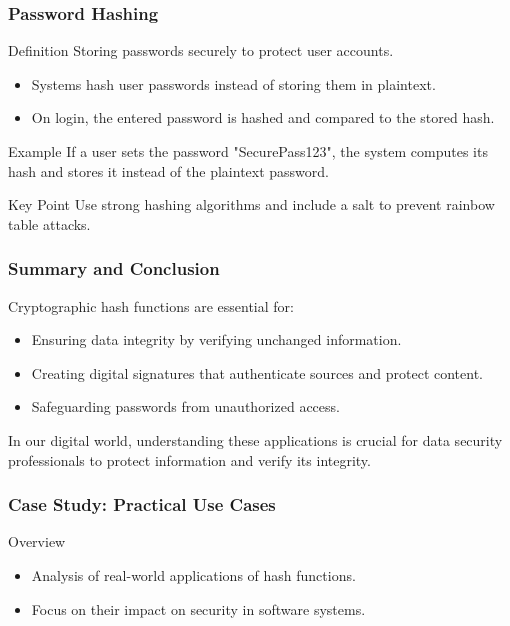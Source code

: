 \documentclass{beamer}
\begin{document}
\begin{frame}[fragile]
    \frametitle{Password Hashing}
    \begin{block}{Definition}
        Storing passwords securely to protect user accounts.
    \end{block}
    \begin{itemize}
        \item Systems hash user passwords instead of storing them in plaintext.
        \item On login, the entered password is hashed and compared to the stored hash.
    \end{itemize}
    \begin{exampleblock}{Example}
        If a user sets the password "SecurePass123", the system computes its hash and stores it instead of the plaintext password.
    \end{exampleblock}
    \begin{block}{Key Point}
        Use strong hashing algorithms and include a salt to prevent rainbow table attacks.
    \end{block}
\end{frame}

\begin{frame}[fragile]
    \frametitle{Summary and Conclusion}
    Cryptographic hash functions are essential for:
    \begin{itemize}
        \item Ensuring data integrity by verifying unchanged information.
        \item Creating digital signatures that authenticate sources and protect content.
        \item Safeguarding passwords from unauthorized access.
    \end{itemize}
    
    In our digital world, understanding these applications is crucial for data security professionals to protect information and verify its integrity.
\end{frame}

\begin{frame}
    \frametitle{Case Study: Practical Use Cases}
    \begin{block}{Overview}
        \begin{itemize}
            \item Analysis of real-world applications of hash functions.
            \item Focus on their impact on security in software systems.
        \end{itemize}
    \end{block}
\end{frame}
\end{document}
